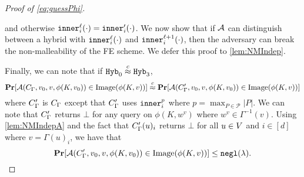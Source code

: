 \begin{proof}[Proof of \cref{eq:guessPhi}]
\begin{itemize}
\begin{itemize}
			and otherwise $\texttt{inner}_i^\ell(\cdot) = \texttt{inner}_i'(\cdot)$. We now show that if $\mathcal{A}$ can distinguish
			between a hybrid with $\texttt{inner}_i^\ell(\cdot)$ and $\texttt{inner}_i^{\ell + 1}(\cdot)$, then the adversary can break
			the non-malleability of the FE scheme.
			We defer this proof to \cref{lem:NMIndep}.
		\end{itemize}
	\end{itemize}
	Finally, we can note that if $\texttt{Hyb}_0 \overset{c}{\approx} \texttt{Hyb}_3$,
	\begin{equation*}
		\operatorname*{\mathbf{Pr}}[\mathcal{A}(C_\Gamma, v_0, v, \phi(K, v_0)) \in \text{Image}(\phi(K, v))] 
		\overset{c}{\approx}
		\operatorname*{\mathbf{Pr}}[\mathcal{A}(C_\Gamma', v_0, v, \phi(K, v_0)) \in \text{Image}(\phi(K, v))] 
	\end{equation*}
	where $C_\Gamma'$ is $C_\Gamma$ except that $C_\Gamma'$ uses $\texttt{inner}_i^p$ where $p = \max_{P \in \mathcal{P}} |P|$.
	We can note that $C_\Gamma'$ returns $\bot$ for any query on $\phi(K, w^v)$ where $w^v \in \Gamma^{-1}(v)$.
	Using \cref{lem:NMIndepA} and the fact that $C_\Gamma'(u)_i$ returns $\bot$ for all $u \in V$ and $i \in [d]$ where $v = \Gamma(u)_i$, we have that
	$$
		\operatorname*{\mathbf{Pr}}[\mathcal{A}(C_\Gamma', v_0, v, \phi(K, v_0)) \in \text{Image}(\phi(K, v))] \leq \texttt{negl}(\lambda).
	$$
	
\end{proof}

